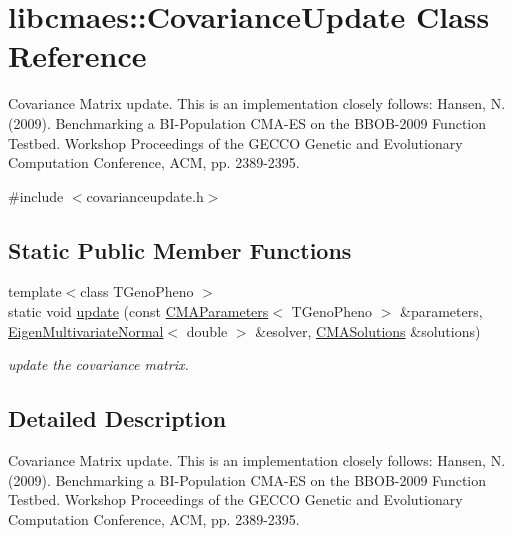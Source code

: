 \hypertarget{classlibcmaes_1_1CovarianceUpdate}{\section{libcmaes\-:\-:Covariance\-Update Class Reference}
\label{classlibcmaes_1_1CovarianceUpdate}
}


Covariance Matrix update. This is an implementation closely follows\-: Hansen, N. (2009). Benchmarking a B\-I-\/\-Population C\-M\-A-\/\-E\-S on the B\-B\-O\-B-\/2009 Function Testbed. Workshop Proceedings of the G\-E\-C\-C\-O Genetic and Evolutionary Computation Conference, A\-C\-M, pp. 2389-\/2395.  




{\ttfamily \#include $<$covarianceupdate.\-h$>$}

\subsection*{Static Public Member Functions}
\begin{DoxyCompactItemize}
\item 
{\footnotesize template$<$class T\-Geno\-Pheno $>$ }\\static void \hyperlink{classlibcmaes_1_1CovarianceUpdate_ae7625c0bc9d335b85c89588d77edec77}{update} (const \hyperlink{classlibcmaes_1_1CMAParameters}{C\-M\-A\-Parameters}$<$ T\-Geno\-Pheno $>$ \&parameters, \hyperlink{classEigen_1_1EigenMultivariateNormal}{Eigen\-Multivariate\-Normal}$<$ double $>$ \&esolver, \hyperlink{classlibcmaes_1_1CMASolutions}{C\-M\-A\-Solutions} \&solutions)
\begin{DoxyCompactList}\small\item\em update the covariance matrix. \end{DoxyCompactList}\end{DoxyCompactItemize}


\subsection{Detailed Description}
Covariance Matrix update. This is an implementation closely follows\-: Hansen, N. (2009). Benchmarking a B\-I-\/\-Population C\-M\-A-\/\-E\-S on the B\-B\-O\-B-\/2009 Function Testbed. Workshop Proceedings of the G\-E\-C\-C\-O Genetic and Evolutionary Computation Conference, A\-C\-M, pp. 2389-\/2395. 

